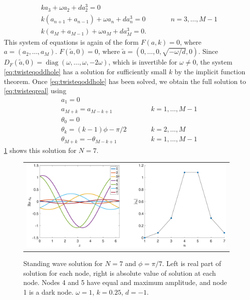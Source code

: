 \documentclass[12pt]{article}
\DeclareMathOperator{\diag}{diag}
\begin{document}
\begin{equation}\label{eq:twisteqoddhole}
\begin{aligned}
& k a_3 + \omega a_2 + d a_2^3 = 0\\
&k( a_{n+1} + a_{n-1} ) + \omega a_n + d a_n^3 = 0 && \qquad n = 3, \dots, M-1 \\
&k ( a_M + a_{M-1} ) + \omega a_M + d a_M^3 = 0.
\end{aligned}
\end{equation}
This system of equations is again of the form $F(a,k) = 0$, where $a = (a_2, \dots, a_M)$. $F(\tilde{a}, 0) = 0$, where $\tilde{a} = (0, \dots, 0, \sqrt{-\omega/d}, 0)$. Since $D_F(\tilde{a}, 0) = \diag(\omega, \dots, \omega, -2\omega)$, which is invertible for $\omega \neq 0$, the system \cref{eq:twisteqoddhole} has a solution for sufficiently small $k$ by the implicit function theorem. Once \cref{eq:twisteqoddhole} has been solved, we obtain the full solution to \cref{eq:twisteqreal} using
\begin{align*}
&a_1 = 0 \\
&a_{M+k} = a_{M-k+1} && \qquad k = 1, \dots, M-1 \\
&\theta_0 = 0 \\
&\theta_k = (k-1)\phi - \pi/2 && \qquad k = 2, \dots, M \\
&\theta_{M+k} = -\theta_{M-k+1} && \qquad k = 1, \dots, M-1
\end{align*}
\cref{fig:oddhole7} shows this solution for $N=7$. 
\begin{figure}[H]
\begin{center}
\begin{tabular}{c}
\includegraphics[width=15cm]{images/oddhole7.eps}
\end{tabular}
\end{center}
\caption{Standing wave solution for $N = 7$ and $\phi = \pi/7$. Left is real part of solution for each node, right is absolute value of solution at each node. Nodes 4 and 5 have equal and maximum amplitude, and node 1 is a dark node. $\omega = 1$, $k = 0.25$, $d=-1$.}
\label{fig:oddhole7}
\end{figure}
\end{document}
